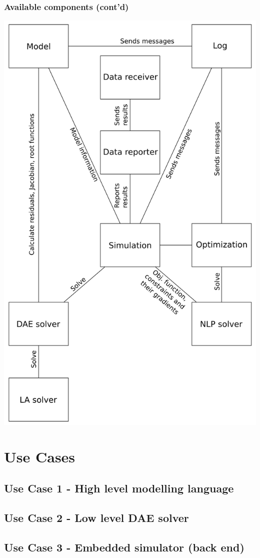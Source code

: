 \documentclass{beamer}
\begin{document}
\begin{frame}
\frametitle{Available components (cont'd)}
\begin{center}
  \includegraphics[height=0.7\paperheight]{../_static/daetools-architecture.png}
\end{center}
\end{frame}

\section{Use Cases} 

\subsection{Use Case 1 - High level modelling language}
\begin{frame}
\frametitle{}
\end{frame}

\subsection{Use Case 2 - Low level DAE solver}
\begin{frame}
\frametitle{}
\end{frame}

\subsection{Use Case 3 - Embedded simulator (back end)}
\begin{frame}
\frametitle{}
\end{frame}
\end{document}
